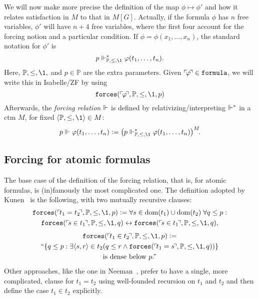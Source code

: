 \documentclass[11pt,english]{article}
\renewcommand{\PP}{\mathbb{P}}
\newcommand{\formula}{\ensuremath{\mathtt{formula}}}
\newcommand{\forceisa}{\mathtt{forces}}
\begin{document}
We will now make more precise the definition of the map
$\phi\mapsto\phi'$ and how it relates satisfaction in $M$ to that in
$M[G]$. Actually, if the formula $\phi$ has $n$ free variables,
$\phi'$ will have $n+4$ free variables, where the first four account
for the forcing notion and a particular condition. If
$\phi=\phi(x_1,\dots,x_n)$, the standard notation for $\phi'$ is
\[
p\forces_{\PP,\leq,\1}^* \phi(t_1,\dots,t_n).
\]
Here, $\PP,\leq,\1,$ and $p\in\PP$ are the extra parameters. 
Given $\quine\phi\in\formula$, we will write this  in
Isabelle/ZF by using  
\[
\forceisa(\quine\phi,\PP,\leq,\1,p)
\]
Afterwards, the \emph{forcing relation} $\Vdash$ is defined by
relativizing/interpreting $\Vdash^*$ in a ctm $M$, for fixed
$\lb\PP,\leq,\1\rb\in M$:
\[
p\forces \phi(t_1,\dots,t_n) \defi 
\bigl(p\forces_{\PP,\leq,\1}^* \phi(t_1,\dots,t_n)\bigr)^M\!.
\]

\subsection{Forcing for atomic formulas}
The base case of the definition of the forcing relation, that is, for
atomic formulas, is (in)famously the most complicated one. 
The definition adopted by Kunen~\cite[p.~257]{kunen2011set} is the
following, with two mutually recursive clauses:
\begin{multline}
  \forceisa(\quine{t_1= t_2},\PP,\leq,\1,p) \defi 
  \forall s\in\dom(t_1)\cup\dom(t_2)\;\forall q\leq p :\\
  \forceisa(\quine{s\in t_1},\PP,\leq,\1,q)\lsii 
  \forceisa(\quine{s\in t_1},\PP,\leq,\1,q),
\end{multline}
\begin{multline}
  \forceisa(\quine{t_1\in t_2},\PP,\leq,\1,p) \defi  \\
  \text{``}\{q\leq p : \exists \lb s,r\rb\in t_2 (q\leq r \y
  \forceisa(\quine{t_1 =s},\PP,\leq,\1,q))\} \\
  \text{is dense below $p$.''}
\end{multline}
Other approaches, like the one in Neeman~\cite{neeman-course}, prefer
to have a single, more complicated, clause for $t_1=t_2$ using
well-founded recursion on $t_1$
and $t_2$ and then define the case $t_1\in t_2$ explicitly. 
\end{document}
